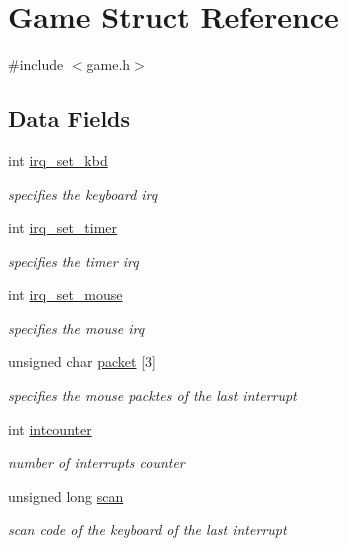 \hypertarget{struct_game}{}\section{Game Struct Reference}
\label{struct_game}


{\ttfamily \#include $<$game.\+h$>$}

\subsection*{Data Fields}
\begin{DoxyCompactItemize}
\item 
int \hyperlink{struct_game_a492428101cf654ca73d0b290d6dc7dfc}{irq\+\_\+set\+\_\+kbd}
\begin{DoxyCompactList}\small\item\em specifies the keyboard irq \end{DoxyCompactList}\item 
int \hyperlink{struct_game_aadbf3757def1a49b68caa15ef9117b0f}{irq\+\_\+set\+\_\+timer}
\begin{DoxyCompactList}\small\item\em specifies the timer irq \end{DoxyCompactList}\item 
int \hyperlink{struct_game_afd357e4e90c5ce77865791f8e690db27}{irq\+\_\+set\+\_\+mouse}
\begin{DoxyCompactList}\small\item\em specifies the mouse irq \end{DoxyCompactList}\item 
unsigned char \hyperlink{struct_game_a1d1878244696a8be772aa71772c33f0a}{packet} \mbox{[}3\mbox{]}
\begin{DoxyCompactList}\small\item\em specifies the mouse packtes of the last interrupt \end{DoxyCompactList}\item 
int \hyperlink{struct_game_aa5694ae37c0e6ed93d4875a167dfde0b}{intcounter}
\begin{DoxyCompactList}\small\item\em number of interrupts counter \end{DoxyCompactList}\item 
unsigned long \hyperlink{struct_game_a6804e7fc07260f01e4dc9db73879948a}{scan}
\begin{DoxyCompactList}\small\item\em scan code of the keyboard of the last interrupt \end{DoxyCompactList}\item 

\end{DoxyCompactItemize}
